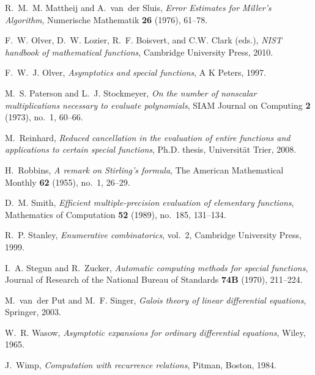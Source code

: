 \documentclass[10pt, conference]{IEEEtran}
\begin{document}
\begin{thebibliography}{10}
R.~M.~M. Mattheij and A.~van~der Sluis, \emph{{Error Estimates for Miller's
  Algorithm}}, {Numerische Mathematik} \textbf{26} (1976), 61--78.

F.~W. Olver, D.~W. Lozier, R.~F. Boisvert, and C.W. Clark (eds.), \emph{{NIST}
  handbook of mathematical functions}, Cambridge University Press, 2010.

F.~W.~J. Olver, \emph{Asymptotics and special functions}, A K Peters, 1997.

M.~S. Paterson and L.~J. Stockmeyer, \emph{On the number of nonscalar
  multiplications necessary to evaluate polynomials}, SIAM Journal on Computing
  \textbf{2} (1973), no.~1, 60--66.

M.~Reinhard, \emph{Reduced cancellation in the evaluation of entire functions
  and applications to certain special functions}, Ph.D. thesis, Universität
  Trier, 2008.

H.~Robbins, \emph{A remark on {S}tirling's formula}, The American Mathematical
  Monthly \textbf{62} (1955), no.~1, 26--29.

{D}.~{M}. {S}mith, \emph{{E}fficient multiple-precision evaluation of
  elementary functions}, {M}athematics of {C}omputation \textbf{52} (1989),
  no.~185, 131--134.

R.~P. Stanley, \emph{Enumerative combinatorics}, vol.~2, Cambridge University
  Press, 1999.

I.~A. Stegun and R.~Zucker, \emph{Automatic computing methods for special
  functions}, Journal of Research of the National Bureau of Standards
  \textbf{74B} (1970), 211--224.

M.~van~der Put and M.~F. Singer, \emph{Galois theory of linear differential
  equations}, Springer, 2003.

W.~R. Wasow, \emph{Asymptotic expansions for ordinary differential equations},
  Wiley, 1965.

J.~Wimp, \emph{Computation with recurrence relations}, Pitman, Boston, 1984.

\end{thebibliography}
\end{document}
